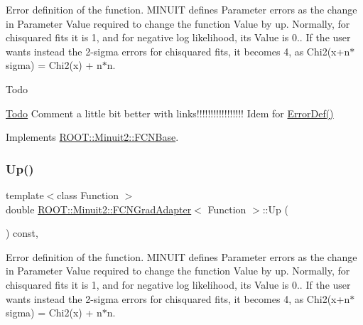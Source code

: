 Error definition of the function. M\+I\+N\+U\+IT defines Parameter errors as the change in Parameter Value required to change the function Value by up. Normally, for chisquared fits it is 1, and for negative log likelihood, its Value is 0.. If the user wants instead the 2-\/sigma errors for chisquared fits, it becomes 4, as Chi2(x+n$\ast$sigma) = Chi2(x) + n$\ast$n.

\begin{DoxyRefDesc}{Todo}
\item[\mbox{\hyperlink{todo__todo000001}{Todo}}]Comment a little bit better with links!!!!!!!!!!!!!!!!! Idem for \mbox{\hyperlink{classROOT_1_1Minuit2_1_1FCNBase_ac4592475c58a65b037ba97ab5f3cba10}{Error\+Def()}}\end{DoxyRefDesc}


Implements \mbox{\hyperlink{classROOT_1_1Minuit2_1_1FCNBase_a04ef08ddad92ce8d89d498efbe021c39}{R\+O\+O\+T\+::\+Minuit2\+::\+F\+C\+N\+Base}}.

\mbox{\label{classROOT_1_1Minuit2_1_1FCNGradAdapter_a99e41f07b3f7374c0b17ef42f1c15a19}} 
\subsubsection{\texorpdfstring{Up()}{Up()}\hspace{0.1cm}{\footnotesize\ttfamily [3/3]}}
{\footnotesize\ttfamily template$<$class Function $>$ \\
double \mbox{\hyperlink{classROOT_1_1Minuit2_1_1FCNGradAdapter}{R\+O\+O\+T\+::\+Minuit2\+::\+F\+C\+N\+Grad\+Adapter}}$<$ Function $>$\+::Up (\begin{DoxyParamCaption}{ }\end{DoxyParamCaption}) const\hspace{0.3cm}{\ttfamily [inline]}, {\ttfamily [virtual]}}

Error definition of the function. M\+I\+N\+U\+IT defines Parameter errors as the change in Parameter Value required to change the function Value by up. Normally, for chisquared fits it is 1, and for negative log likelihood, its Value is 0.. If the user wants instead the 2-\/sigma errors for chisquared fits, it becomes 4, as Chi2(x+n$\ast$sigma) = Chi2(x) + n$\ast$n.

